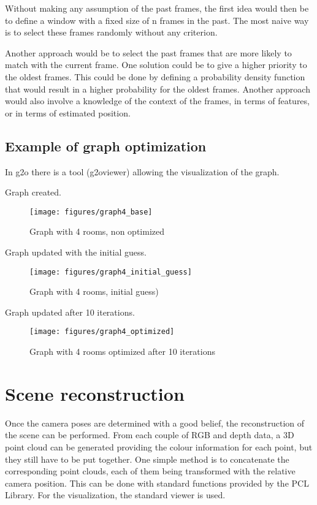 Without making any assumption of the past frames, the first idea would then be to define a window with a fixed size of n frames in the past. The most naive way is to select these frames randomly without any criterion.

 Another approach would be to select the past frames that are more likely to match with the current frame. One solution could be to give a higher priority to the oldest frames. This could be done by defining a probability density function that would result in a higher probability for the oldest frames. Another approach would also involve a knowledge of the context of the frames, in terms of features, or in terms of estimated position.

\section{Example of graph optimization}
In g2o there is a tool (g2oviewer) allowing the visualization of the graph.

Graph created.
\begin{figure}[h]
\centering
\texttt{[image: figures/graph4\_base]}
\caption{Graph with 4 rooms, non optimized}
\end{figure}

Graph updated with the initial guess.
\begin{figure}[h]
\centering
\texttt{[image: figures/graph4\_initial\_guess]}
\caption{Graph with 4 rooms, initial guess)}
\end{figure}

Graph updated after 10 iterations.
\begin{figure}[h]
\centering
\texttt{[image: figures/graph4\_optimized]}
\caption{Graph with 4 rooms optimized after 10 iterations}
\end{figure}

\clearpage

\chapter{Scene reconstruction}

Once the camera poses are determined with a good belief, the reconstruction of the scene can be performed. From each couple of RGB and depth data, a 3D point cloud can be generated providing the colour information for each point, but they still have to be put together. One simple method is to concatenate the corresponding point clouds, each of them being transformed with the relative camera position. This can be done with standard functions provided by the PCL Library. For the visualization, the standard viewer is used.

